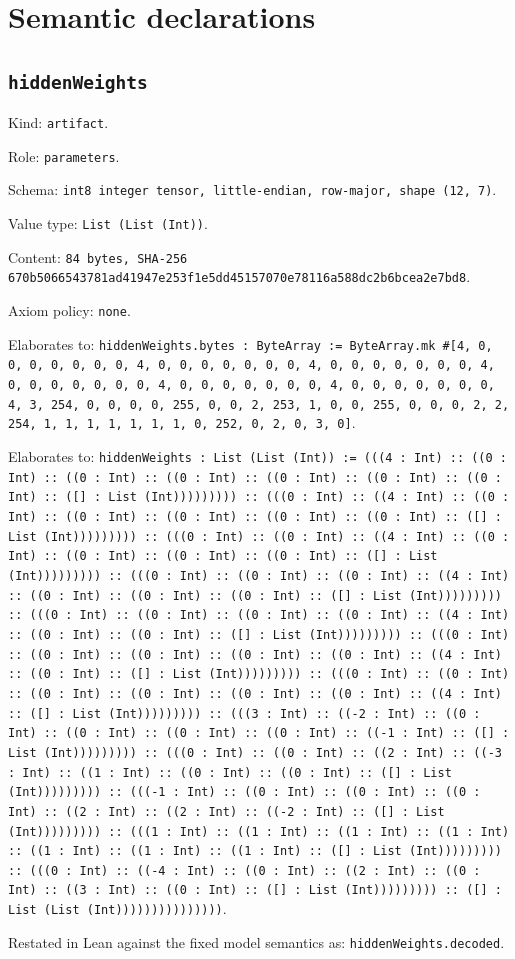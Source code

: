 \documentclass[11pt]{article}
\begin{document}
\section*{Semantic declarations}
\subsection*{\texttt{hiddenWeights}}
\noindent Kind: \texttt{artifact}.\par
\noindent Role: \texttt{parameters}.\par
\noindent Schema: \texttt{int8 integer tensor, little-endian, row-major, shape (12, 7)}.\par
\noindent Value type: \texttt{List (List (Int))}.\par
\noindent Content: \texttt{84 bytes, SHA-256 670b5066543781ad41947e253f1e5dd45157070e78116a588dc2b6bcea2e7bd8}.\par
\noindent Axiom policy: \texttt{none}.\par
\noindent Elaborates to: \texttt{hiddenWeights.bytes : ByteArray := ByteArray.mk \#[4, 0, 0, 0, 0, 0, 0, 0, 4, 0, 0, 0, 0, 0, 0, 0, 4, 0, 0, 0, 0, 0, 0, 0, 4, 0, 0, 0, 0, 0, 0, 0, 4, 0, 0, 0, 0, 0, 0, 0, 4, 0, 0, 0, 0, 0, 0, 0, 4, 3, 254, 0, 0, 0, 0, 255, 0, 0, 2, 253, 1, 0, 0, 255, 0, 0, 0, 2, 2, 254, 1, 1, 1, 1, 1, 1, 1, 0, 252, 0, 2, 0, 3, 0]}.\par
\noindent Elaborates to: \texttt{hiddenWeights : List (List (Int)) := (((4 : Int) :: ((0 : Int) :: ((0 : Int) :: ((0 : Int) :: ((0 : Int) :: ((0 : Int) :: ((0 : Int) :: ([] : List (Int))))))))) :: (((0 : Int) :: ((4 : Int) :: ((0 : Int) :: ((0 : Int) :: ((0 : Int) :: ((0 : Int) :: ((0 : Int) :: ([] : List (Int))))))))) :: (((0 : Int) :: ((0 : Int) :: ((4 : Int) :: ((0 : Int) :: ((0 : Int) :: ((0 : Int) :: ((0 : Int) :: ([] : List (Int))))))))) :: (((0 : Int) :: ((0 : Int) :: ((0 : Int) :: ((4 : Int) :: ((0 : Int) :: ((0 : Int) :: ((0 : Int) :: ([] : List (Int))))))))) :: (((0 : Int) :: ((0 : Int) :: ((0 : Int) :: ((0 : Int) :: ((4 : Int) :: ((0 : Int) :: ((0 : Int) :: ([] : List (Int))))))))) :: (((0 : Int) :: ((0 : Int) :: ((0 : Int) :: ((0 : Int) :: ((0 : Int) :: ((4 : Int) :: ((0 : Int) :: ([] : List (Int))))))))) :: (((0 : Int) :: ((0 : Int) :: ((0 : Int) :: ((0 : Int) :: ((0 : Int) :: ((0 : Int) :: ((4 : Int) :: ([] : List (Int))))))))) :: (((3 : Int) :: ((-2 : Int) :: ((0 : Int) :: ((0 : Int) :: ((0 : Int) :: ((0 : Int) :: ((-1 : Int) :: ([] : List (Int))))))))) :: (((0 : Int) :: ((0 : Int) :: ((2 : Int) :: ((-3 : Int) :: ((1 : Int) :: ((0 : Int) :: ((0 : Int) :: ([] : List (Int))))))))) :: (((-1 : Int) :: ((0 : Int) :: ((0 : Int) :: ((0 : Int) :: ((2 : Int) :: ((2 : Int) :: ((-2 : Int) :: ([] : List (Int))))))))) :: (((1 : Int) :: ((1 : Int) :: ((1 : Int) :: ((1 : Int) :: ((1 : Int) :: ((1 : Int) :: ((1 : Int) :: ([] : List (Int))))))))) :: (((0 : Int) :: ((-4 : Int) :: ((0 : Int) :: ((2 : Int) :: ((0 : Int) :: ((3 : Int) :: ((0 : Int) :: ([] : List (Int))))))))) :: ([] : List (List (Int)))))))))))))))}.\par
\noindent Restated in Lean against the fixed model semantics as: \texttt{hiddenWeights.decoded}.\par
\end{document}
